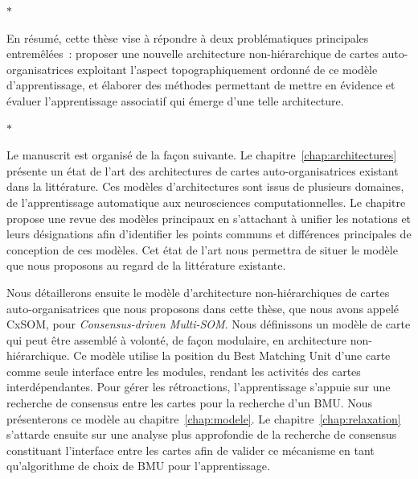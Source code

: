 \begin{center}
  $\ast$
\end{center}

En résumé, cette thèse vise à répondre à deux problématiques principales entremêlées~: proposer une nouvelle architecture non-hiérarchique de cartes auto-organisatrices exploitant l'aspect topographiquement ordonné de ce modèle d'apprentissage, et élaborer des méthodes permettant de mettre en évidence et évaluer l'apprentissage associatif qui émerge d'une telle architecture.

\begin{center}
  $\ast$
\end{center}

Le manuscrit est organisé de la façon suivante.
Le chapitre~\ref{chap:architectures} présente un état de l'art des architectures de cartes auto-organisatrices existant dans la littérature. Ces modèles d'architectures sont issus de plusieurs domaines, de l'apprentissage automatique aux neurosciences computationnelles.
Le chapitre propose une revue des modèles principaux en s'attachant à unifier les notations et leurs désignations afin d'identifier les points communs et différences principales de conception de ces modèles.
Cet état de l'art nous permettra de situer le modèle que nous proposons au regard de la littérature existante.

Nous détaillerons ensuite le modèle d'architecture non-hiérarchiques de cartes auto-organisatrices que nous proposons dans cette thèse, que nous avons appelé CxSOM, pour \emph{Consensus-driven Multi-SOM}. 
Nous définissons un modèle de carte qui peut être assemblé à volonté, de façon modulaire, en architecture non-hiérarchique.
Ce modèle utilise la position du Best Matching Unit d'une carte comme seule interface entre les modules, rendant les activités des cartes interdépendantes. Pour gérer les rétroactions, l'apprentissage s'appuie sur une recherche de consensus entre les cartes pour la recherche d'un BMU.
Nous présenterons ce modèle au chapitre~\ref{chap:modele}. Le chapitre~\ref{chap:relaxation} s'attarde ensuite sur une analyse plus approfondie de la recherche de consensus constituant l'interface entre les cartes afin de valider ce mécanisme en tant qu'algorithme de choix de BMU pour l'apprentissage.


